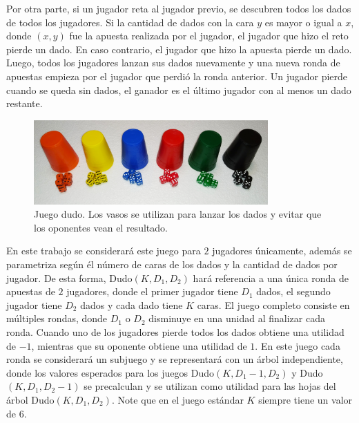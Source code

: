 Por otra parte, si un jugador reta al jugador previo, se descubren todos los dados de todos los jugadores. Si la cantidad de dados con la cara $y$ es mayor o igual a $x$, donde $(x, y)$ fue la apuesta realizada por el jugador, el jugador que hizo el reto pierde un dado. En caso contrario, el jugador que hizo la apuesta pierde un dado. Luego, todos los jugadores lanzan sus dados nuevamente y una nueva ronda de apuestas empieza por el jugador que perdió la ronda anterior. Un jugador pierde cuando se queda sin dados, el ganador es el último jugador con al menos un dado restante.

\begin{figure}[t]
    \centering
    \includegraphics[width=0.8\textwidth]{figuras/dudo.jpg}
    \caption{Juego dudo. Los vasos se utilizan para lanzar los dados y evitar que los oponentes vean el resultado.}
    \label{fig:dudo}
\end{figure}


En este trabajo se considerará este juego para $2$ jugadores únicamente, además se parametriza según él número de caras de los dados y la cantidad de dados por jugador. De esta forma,
Dudo$(K, D_1, D_2)$ hará referencia a una única ronda de apuestas de $2$ jugadores, donde el primer jugador tiene $D_1$ dados, el segundo jugador tiene $D_2$ dados y cada dado tiene $K$ caras. El juego completo consiste en múltiples rondas, donde $D_1$ o $D_2$ disminuye en una unidad al finalizar cada ronda. Cuando uno de los jugadores pierde todos los dados obtiene una utilidad de $-1$, mientras que su oponente obtiene una utilidad de $1$. En este juego cada ronda se considerará un subjuego y se representará con un árbol independiente, donde los valores esperados para los juegos Dudo$(K, D_1 - 1, D_2)$ y Dudo$(K, D_1, D_2 - 1)$ se precalculan y se utilizan como utilidad para las hojas del árbol Dudo$(K, D_1, D_2)$. Note que en el juego estándar $K$ siempre tiene un valor de $6$.

